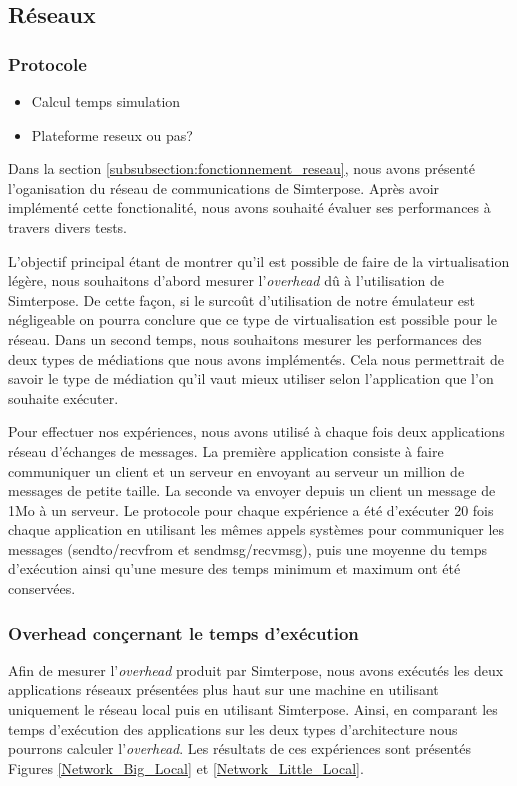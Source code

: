 \subsection{Réseaux}
\label{subsection:res}
\subsubsection{Protocole}
\begin{itemize}
  \item Calcul temps simulation
  \item Plateforme reseux ou pas?
\end{itemize}

Dans la section \ref{subsubsection:fonctionnement_reseau}, nous avons présenté l'oganisation du réseau de communications de Simterpose. Après avoir implémenté cette fonctionalité, nous avons souhaité évaluer ses performances à travers divers tests.

L'objectif principal étant de montrer qu'il est possible de faire de la virtualisation légère, nous souhaitons d'abord mesurer l'\textit{overhead} dû à l'utilisation de Simterpose. De cette façon, si le surcoût d'utilisation de notre émulateur est négligeable on pourra conclure que ce type de virtualisation est possible pour le réseau. Dans un second temps, nous souhaitons mesurer les performances des deux types de médiations que nous avons implémentés. Cela nous permettrait de savoir le type de médiation qu'il vaut mieux utiliser selon l'application que l'on souhaite exécuter.

Pour effectuer nos expériences, nous avons utilisé à chaque fois deux applications réseau d'échanges de messages. La première application consiste à faire communiquer un client et un serveur en envoyant au serveur un million de messages de petite taille. La seconde va envoyer depuis un client un message de 1Mo à un serveur. Le protocole pour chaque expérience a été d'exécuter 20 fois chaque application en utilisant les mêmes appels systèmes pour communiquer les messages ({\color{red}sendto/recvfrom et sendmsg/recvmsg}), puis une moyenne du temps d'exécution ainsi qu'une mesure des temps minimum et maximum ont été conservées.

\subsubsection{Overhead conçernant le temps d'exécution}
Afin de mesurer l'\textit{overhead} produit par Simterpose, nous avons exécutés les deux applications réseaux présentées plus haut sur une machine en utilisant uniquement le réseau local puis en utilisant Simterpose. Ainsi, en comparant les temps d'exécution des applications sur les deux types d'architecture nous pourrons calculer l'\textit{overhead}. Les résultats de ces expériences sont présentés Figures \ref{Network_Big_Local} et \ref{Network_Little_Local}.

